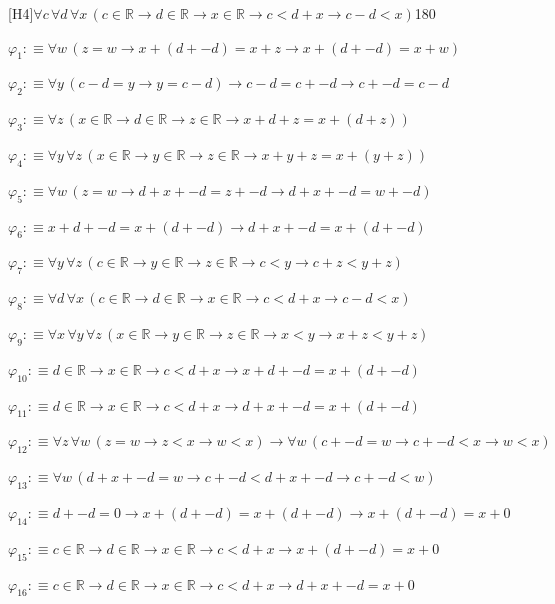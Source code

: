 \begin{fullproof}{[H4]}{$\forall c\,\forall d\,\forall x\,(c \in \mathbb{R} \to d \in \mathbb{R} \to x \in \mathbb{R} \to c < d + x \to c - d < x)$}{180}
\begin{ptree}
\end{ptree}
\begin{abbrevlist}
\item $\varphi_{1} :\equiv \forall w\,(z = w \to x + (d + -d) = x + z \to x + (d + -d) = x + w)$
\item $\varphi_{2} :\equiv \forall y\,(c - d = y \to y = c - d) \to c - d = c + -d \to c + -d = c - d$
\item $\varphi_{3} :\equiv \forall z\,(x \in \mathbb{R} \to d \in \mathbb{R} \to z \in \mathbb{R} \to x + d + z = x + (d + z))$
\item $\varphi_{4} :\equiv \forall y\,\forall z\,(x \in \mathbb{R} \to y \in \mathbb{R} \to z \in \mathbb{R} \to x + y + z = x + (y + z))$
\item $\varphi_{5} :\equiv \forall w\,(z = w \to d + x + -d = z + -d \to d + x + -d = w + -d)$
\item $\varphi_{6} :\equiv x + d + -d = x + (d + -d) \to d + x + -d = x + (d + -d)$
\item $\varphi_{7} :\equiv \forall y\,\forall z\,(c \in \mathbb{R} \to y \in \mathbb{R} \to z \in \mathbb{R} \to c < y \to c + z < y + z)$
\item $\varphi_{8} :\equiv \forall d\,\forall x\,(c \in \mathbb{R} \to d \in \mathbb{R} \to x \in \mathbb{R} \to c < d + x \to c - d < x)$
\item $\varphi_{9} :\equiv \forall x\,\forall y\,\forall z\,(x \in \mathbb{R} \to y \in \mathbb{R} \to z \in \mathbb{R} \to x < y \to x + z < y + z)$
\item $\varphi_{10} :\equiv d \in \mathbb{R} \to x \in \mathbb{R} \to c < d + x \to x + d + -d = x + (d + -d)$
\item $\varphi_{11} :\equiv d \in \mathbb{R} \to x \in \mathbb{R} \to c < d + x \to d + x + -d = x + (d + -d)$
\item $\varphi_{12} :\equiv \forall z\,\forall w\,(z = w \to z < x \to w < x) \to \forall w\,(c + -d = w \to c + -d < x \to w < x)$
\item $\varphi_{13} :\equiv \forall w\,(d + x + -d = w \to c + -d < d + x + -d \to c + -d < w)$
\item $\varphi_{14} :\equiv d + -d = 0 \to x + (d + -d) = x + (d + -d) \to x + (d + -d) = x + 0$
\item $\varphi_{15} :\equiv c \in \mathbb{R} \to d \in \mathbb{R} \to x \in \mathbb{R} \to c < d + x \to x + (d + -d) = x + 0$
\item $\varphi_{16} :\equiv c \in \mathbb{R} \to d \in \mathbb{R} \to x \in \mathbb{R} \to c < d + x \to d + x + -d = x + 0$

\end{abbrevlist}
\end{fullproof}
